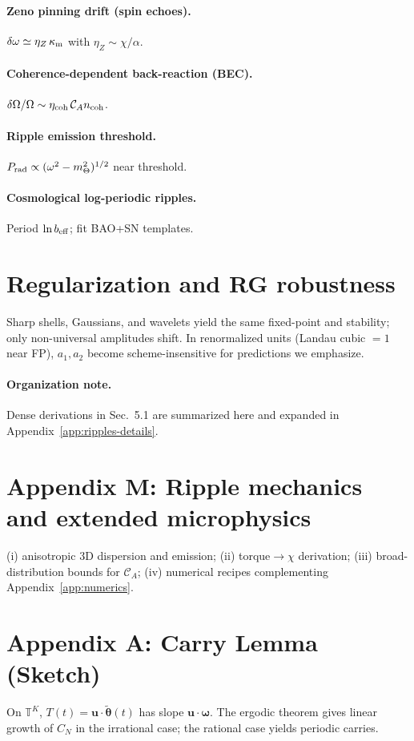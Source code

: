\documentclass[11pt]{article}
\newcommand{\TT}{\mathbb T}
\newcommand{\vect}[1]{\boldsymbol{#1}}
\begin{document}
\paragraph{Zeno pinning drift (spin echoes).} $\delta\omega \simeq \eta_Z\,\kappa_{\rm m}$ with $\eta_Z\sim \chi/\alpha$.
\paragraph{Coherence-dependent back-reaction (BEC).} $\delta\Omega/\Omega \sim \eta_{\rm coh}\,\mathcal C_A n_{\rm coh}$.
\paragraph{Ripple emission threshold.} $P_{\rm rad}\propto (\omega^2-m_\Theta^2)^{1/2}$ near threshold.
\paragraph{Cosmological log-periodic ripples.} Period $\ln b_{\rm eff}$; fit BAO+SN templates.

\section{Regularization and RG robustness}\label{sec:rg-robust}
Sharp shells, Gaussians, and wavelets yield the same fixed-point and stability; only non-universal amplitudes shift.
In renormalized units (Landau cubic $=1$ near FP), $a_1,a_2$ become scheme-insensitive for predictions we emphasize.



\paragraph{Organization note.}
Dense derivations in Sec.~5.1 are summarized here and expanded in Appendix~\ref{app:ripples-details}.

\appendix
\section*{Appendix M: Ripple mechanics and extended microphysics}\label{app:ripples-details}
(i) anisotropic 3D dispersion and emission; (ii) torque$\to\chi$ derivation; (iii) broad-distribution bounds for $\mathcal C_A$; (iv) numerical recipes complementing Appendix~\ref{app:numerics}.

\appendix

\section*{Appendix A: Carry Lemma (Sketch)}
On $\TT^K$, $T(t)=\vect u\!\cdot\!\tilde{\vect\theta}(t)$ has slope $\vect u\!\cdot\!\vect\omega$. The ergodic theorem gives linear growth of $C_N$ in the irrational case; the rational case yields periodic carries.
\end{document}

